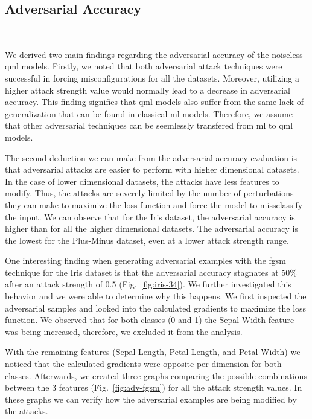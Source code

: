 \pagebreak

\subsection{Adversarial Accuracy}\label{subsection:model_adv_acc} \

We derived two main findings regarding the adversarial accuracy
of the noiseless \ac{qml} models. Firstly, we noted that both
adversarial attack techniques were successful in forcing
misconfigurations for all the datasets. Moreover, utilizing
a higher attack strength value would normally lead to a
decrease in adversarial accuracy. This finding signifies
that \ac{qml} models also suffer from the same lack of generalization
that can be found in classical \ac{ml} models. Therefore, we assume
that other adversarial techniques can be seemlessly transfered
from \ac{ml} to \ac{qml} models. \

The second deduction we can make from the adversarial
accuracy evaluation is that adversarial attacks are
easier to perform with higher dimensional datasets. 
In the case of lower dimensional datasets, the attacks have
less features to modify. Thus, the attacks are severely limited
by the number of perturbations they can make to maximize
the loss function and force the model to missclassify the
input. We can observe that for the Iris dataset, the
adversarial accuracy is higher than for all the higher
dimensional datasets. The adversarial accuracy is
the lowest for the Plus-Minus dataset, even at a
lower attack strength range. \

One interesting finding when generating adversarial examples
with the \ac{fgsm} technique for the Iris dataset is that
the adversarial accuracy stagnates at 50\% after an attack strength
of 0.5 (Fig.~\ref{fig:iris-34}). We further investigated
this behavior and we were able to determine why this happens.
We first inspected the adversarial samples and looked into the
calculated gradients to maximize the loss function. We observed
that for both classes (0 and 1) the Sepal Width feature was
being increased, therefore, we excluded it from the analysis. \

With the remaining features (Sepal Length, Petal Length, and Petal Width)
we noticed that the calculated gradients were opposite per dimension for
both classes. Afterwards, we created three graphs comparing the possible
combinations between the 3 features (Fig.~\ref{fig:adv-fgsm}) for all
the attack strength values. In these graphs we can verify how the
adversarial examples are being modified by the attacks. \

